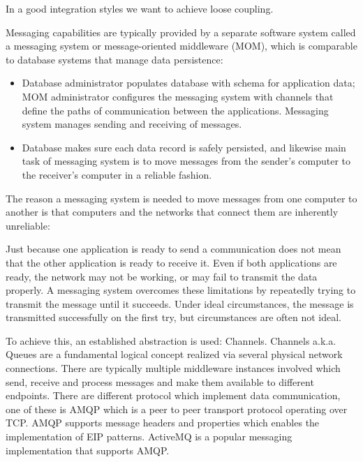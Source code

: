 \documentclass[../Main.tex]{subfiles}
\begin{document}
In a good integration styles we want to achieve loose coupling.

Messaging capabilities are typically provided by a separate software system called a messaging system or 
message-oriented middleware (MOM), which is comparable to database systems that manage data 
persistence:
\begin{itemize}
    \item Database administrator populates database with schema for application data; MOM administrator 
    configures the messaging system with channels that define the paths of communication between the 
    applications. Messaging system manages sending and receiving of messages.
    \item Database makes sure each data record is safely persisted, and likewise main task of messaging system 
    is to move messages from the sender's computer to the receiver's computer in a reliable fashion.
\end{itemize}
The reason a messaging system is needed to move messages from one computer to 
another is that computers and the networks that connect them are inherently unreliable:

Just because one application is ready to send a communication does not mean that the 
other application is ready to receive it.
Even if both applications are ready, the network may not be working, or may fail to 
transmit the data properly.
A messaging system overcomes these limitations by repeatedly trying to transmit the 
message until it succeeds. Under ideal circumstances, the message is transmitted 
successfully on the first try, but circumstances are often not ideal.

To achieve this, an established abstraction is used: Channels.
Channels a.k.a. Queues are a fundamental logical concept realized via several physical network connections.
There are typically multiple middleware instances involved which send, receive and process messages and make them
available to different endpoints. There are different protocol which implement data communication, one
of these is AMQP which is a peer to peer transport protocol operating over TCP. AMQP supports message headers and properties
which enables the implementation of EIP patterns. ActiveMQ is a popular messaging implementation that supports AMQP.
\end{document}
